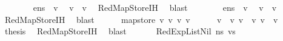 \begin{isabellebody}
\ \ \ \ \isamarkupfalse%
\ {\isachardoublequoteopen}{\isasymLambda}{\isacharcomma}{\kern0pt}{\isasymGamma}{\isacharcomma}{\kern0pt}{\isasymOmega}\ {\isasymturnstile}\ {\isasymlangle}e{}{\isacharcomma}{\kern0pt}n{\isacharunderscore}{\kern0pt}s{\isasymrangle}\ {\isasymDown}\ v{}{\isacharprime}{\kern0pt}{\isachardoublequoteclose}\ \isamarkupfalse%
\ {\isachardoublequoteopen}v{}\ {\isacharequal}{\kern0pt}\ v{}{\isacharprime}{\kern0pt}{\isachardoublequoteclose}\ \isamarkupfalse%
\ RedMapStore{\isachardot}{\kern0pt}IH\ \isamarkupfalse%
\ blast\isanewline
\ \ \ \ \isamarkupfalse%
\ {\isachardoublequoteopen}{\isasymLambda}{\isacharcomma}{\kern0pt}{\isasymGamma}{\isacharcomma}{\kern0pt}{\isasymOmega}\ {\isasymturnstile}\ {\isasymlangle}e{}{\isacharcomma}{\kern0pt}n{\isacharunderscore}{\kern0pt}s{\isasymrangle}\ {\isasymDown}\ v{}{\isacharprime}{\kern0pt}{\isachardoublequoteclose}\ \isamarkupfalse%
\ {\isachardoublequoteopen}v{}\ {\isacharequal}{\kern0pt}\ v{}{\isacharprime}{\kern0pt}{\isachardoublequoteclose}\ \isamarkupfalse%
\ RedMapStore{\isachardot}{\kern0pt}IH\ \isamarkupfalse%
\ blast\isanewline
\ \ \ \ \isamarkupfalse%
\ {\isachardoublequoteopen}map{\isacharunderscore}{\kern0pt}store\ v{}{\isacharprime}{\kern0pt}\ v{}{\isacharprime}{\kern0pt}\ v{}{\isacharprime}{\kern0pt}{\isacharequal}{\kern0pt}\ v{\isacharprime}{\kern0pt}{\isachardoublequoteclose}\isanewline
\ \ \ \ \isamarkupfalse%
\ {\isacartoucheopen}v{}\ {\isacharequal}{\kern0pt}\ v{}{\isacharprime}{\kern0pt}{\isacartoucheclose}\ {\isacartoucheopen}v{}\ {\isacharequal}{\kern0pt}\ v{}{\isacharprime}{\kern0pt}{\isacartoucheclose}\ {\isacartoucheopen}v{}\ {\isacharequal}{\kern0pt}\ v{}{\isacharprime}{\kern0pt}{\isacartoucheclose}\ \isamarkupfalse%
\ {\isacharquery}{\kern0pt}thesis\ \isamarkupfalse%
\ RedMapStore{\isachardot}{\kern0pt}IH\ \isamarkupfalse%
\ blast\isanewline
\ \ \isamarkupfalse%
\isanewline
{}\isamarkupfalse%
\isanewline
\ \ \isamarkupfalse%
\ {\isacharparenleft}{\kern0pt}RedExpListNil\ n{\isacharunderscore}{\kern0pt}s\ vs{\isacharprime}{\kern0pt}{\isacharparenright}{\kern0pt}\isanewline

\end{isabellebody}
